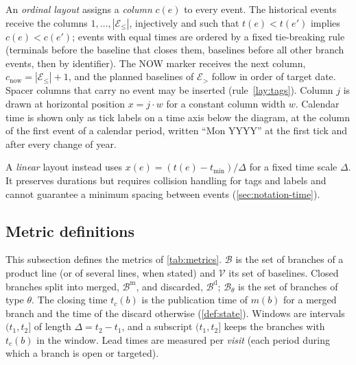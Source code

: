 \begin{definition}
  \label{def:ordinal}
  An \emph{ordinal layout} assigns a \emph{column} $c(e)$ to every event.
  The historical events receive the columns $1, \dots, |\mathcal{E}_{\le}|$,
  injectively and such that $t(e) < t(e')$ implies $c(e) < c(e')$; events
  with equal times are ordered by a fixed tie-breaking rule (terminals
  before the baseline that closes them, baselines before all other branch
  events, then by identifier). The NOW marker receives the next column,
  $c_{\mathrm{now}} = |\mathcal{E}_{\le}| + 1$, and the planned baselines
  of $\mathcal{E}_{>}$ follow in order of target date. Spacer columns that
  carry no event may be inserted (rule~\ref{lay:tags}). Column $j$ is drawn
  at horizontal position $x = j \cdot w$ for a constant column width $w$.
  Calendar time is shown only as tick labels on a time axis below the
  diagram, at the column of the first event of a calendar period, written
  ``Mon YYYY'' at the first tick and after every change of year.
\end{definition}

A \emph{linear} layout instead uses $x(e) = (t(e) - t_{\min}) / \Delta$
for a fixed time scale $\Delta$. It preserves durations but requires
collision handling for tags and labels and cannot guarantee a minimum
spacing between events (\cref{sec:notation-time}).

\subsection{Metric definitions}
\label{app:metrics}

This subsection defines the metrics of \cref{tab:metrics}. $\mathcal{B}$
is the set of branches of a product line (or of several lines, when
stated) and $\mathcal{V}$ its set of baselines. Closed branches split into
merged, $\mathcal{B}^{\mathrm{m}}$, and discarded,
$\mathcal{B}^{\mathrm{d}}$; $\mathcal{B}_\theta$ is the set of branches of
type $\theta$. The closing time $t_c(b)$ is the publication time of $m(b)$
for a merged branch and the time of the discard otherwise
(\cref{def:state}). Windows are intervals $(t_1,t_2]$ of length
$\Delta=t_2-t_1$, and a subscript $(t_1,t_2]$ keeps the branches with
$t_c(b)$ in the window. Lead times are measured per \emph{visit} (each
period during which a branch is open or targeted).


